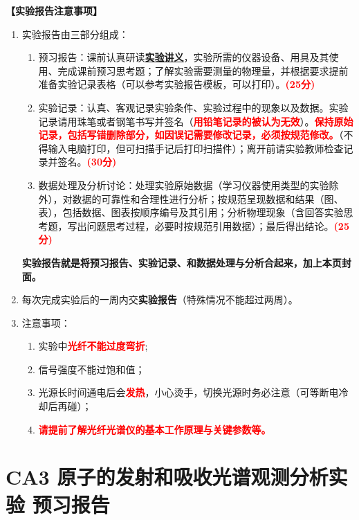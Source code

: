 \documentclass[dvipsnames, svgnames,a4paper,11pt]{article}
\begin{document}
\textbf{【实验报告注意事项】}
\begin{enumerate}
	\item 实验报告由三部分组成：
	\begin{enumerate}[label=\textup{(\arabic*)}]
		\item 预习报告：课前认真研读\underline{\textbf{实验讲义}}，实验所需的仪器设备、用具及其使用、完成课前预习思考题；了解实验需要测量的物理量，并根据要求提前准备实验记录表格（可以参考实验报告模板，可以打印）。\textcolor{red}{\textbf{(25分)}}
		
	    \item 实验记录：认真、客观记录实验条件、实验过程中的现象以及数据。实验记录请用珠笔或者钢笔书写并签名（\textcolor{red}{\textbf{用铅笔记录的被认为无效}}）。\textcolor{red}{\textbf{保持原始记录，包括写错删除部分，如因误记需要修改记录，必须按规范修改。}}（不得输入电脑打印，但可扫描手记后打印扫描件）；离开前请实验教师检查记录并签名。\textcolor{red}{\textbf{(30分)}}
	    
	    \item 数据处理及分析讨论：处理实验原始数据（学习仪器使用类型的实验除外），对数据的可靠性和合理性进行分析；按规范呈现数据和结果（图、表），包括数据、图表按顺序编号及其引用；分析物理现象（含回答实验思考题，写出问题思考过程，必要时按规范引用数据）；最后得出结论。\textcolor{red}{\textbf{(25分)}}
	    
	\end{enumerate}
	\textbf{实验报告就是将预习报告、实验记录、和数据处理与分析合起来，加上本页封面。}
	\item 每次完成实验后的一周内交\textbf{实验报告}（特殊情况不能超过两周）。
	\item 注意事项：
		\begin{enumerate}[label=\textup{(\arabic*)}]
			\item 实验中\textcolor{red}{\textbf{光纤不能过度弯折}};
			\item 信号强度不能过饱和值；
			\item 光源长时间通电后会\textcolor{red}{\textbf{发热}}，小心烫手，切换光源时务必注意（可等断电冷却后再碰）；
			\item \textcolor{red}{\textbf{请提前了解光纤光谱仪的基本工作原理与关键参数等。}}
		\end{enumerate}
\end{enumerate}



\clearpage
\tableofcontents
\clearpage

\setcounter{section}{0}
\section{CA3 \quad 原子的发射和吸收光谱观测分析实验 \quad\heiti 预习报告}
	
\end{document}
